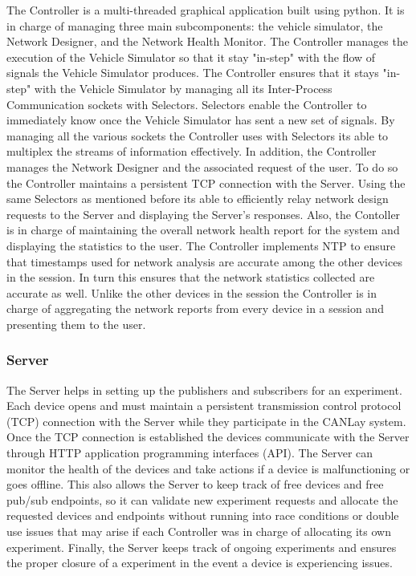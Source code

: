 \documentclass[letterpaper,twocolumn,12pt]{article}
\begin{document}
The Controller is a multi-threaded graphical application built using python. It is in charge of managing three main subcomponents: the vehicle simulator, the Network Designer, and the Network Health Monitor. The Controller manages the execution of the Vehicle Simulator so that it stay "in-step" with the flow of signals the Vehicle Simulator produces. The Controller ensures that it stays "in-step" with the Vehicle Simulator by managing all its Inter-Process Communication sockets with Selectors. Selectors enable the Controller to immediately know once the Vehicle Simulator has sent a new set of signals. By managing all the various sockets the Controller uses with Selectors its able to multiplex the streams of information effectively. In addition, the Controller manages the Network Designer and the associated request of the user. To do so the Controller maintains a persistent TCP connection with the Server. Using the same Selectors as mentioned before its able to efficiently relay network design requests to the Server and displaying the Server's responses. Also, the Contoller is in charge of maintaining the overall network health report for the system and displaying the statistics to the user. The Controller implements NTP to ensure that timestamps used for network analysis are accurate among the other devices in the session. In turn this ensures that the network statistics collected are accurate as well. Unlike the other devices in the session the Controller is in charge of aggregating the network reports from every device in a session and presenting them to the user.

\subsubsection{Server}
The Server helps in setting up the publishers and subscribers for an experiment. Each device opens and must maintain a persistent transmission control protocol (TCP) connection with the Server while they participate in the CANLay system. Once the TCP connection is established the devices communicate with the Server through HTTP application programming interfaces (API). The Server can monitor the health of the devices and take actions if a device is malfunctioning or goes offline. This also allows the Server to keep track of free devices and free pub/sub endpoints, so it can validate new experiment requests and allocate the requested devices and endpoints without running into race conditions or double use issues that may arise if each Controller was in charge of allocating its own experiment. Finally, the Server keeps track of ongoing experiments and ensures the proper closure of a experiment in the event a device is experiencing issues.
\end{document}
